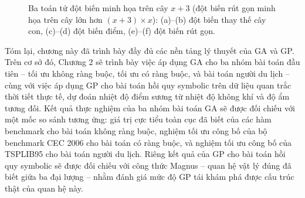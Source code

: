 \begin{figure}[H]
\caption{Ba toán tử đột biến minh họa trên cây $x+3$ (đột biến rút
gọn minh họa trên cây lớn hơn $(x+3)\times x$): (a)--(b) đột biến thay
thế cây con, (c)--(d) đột biến điểm, (e)--(f) đột biến rút gọn.}
\label{fig:gp-mutation}
\end{figure}

Tóm lại, chương này đã trình bày đầy đủ các nền tảng lý thuyết của GA
và GP. Trên cơ sở đó, Chương 2 sẽ trình bày việc áp dụng GA cho ba
nhóm bài toán đầu tiên -- tối ưu không ràng buộc, tối ưu có ràng buộc,
và bài toán người du lịch -- cùng với việc áp dụng GP cho bài toán hồi
quy symbolic trên dữ liệu quan trắc thời tiết thực tế, dự đoán nhiệt độ
điểm sương từ nhiệt độ không khí và độ ẩm tương đối. Kết quả thực nghiệm
của ba nhóm bài toán GA sẽ được đối
chiếu với một mốc so sánh tương ứng: giá trị cực tiểu toàn cục đã biết
của các hàm benchmark cho bài toán không ràng buộc, nghiệm tối ưu công
bố của bộ benchmark CEC 2006 cho bài toán có ràng buộc, và nghiệm tối ưu
công bố của TSPLIB95 cho bài toán người du lịch. Riêng kết quả của GP
cho bài toán hồi quy symbolic sẽ được đối chiếu với công thức Magnus --
quan hệ vật lý đúng đã biết giữa ba đại lượng -- nhằm đánh giá mức độ
GP tái khám phá được cấu trúc thật của quan hệ này.
